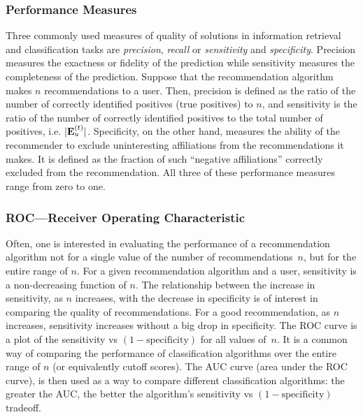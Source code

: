 \subsubsection{Performance Measures}
Three commonly used measures of quality of solutions in information retrieval and classification tasks are \textit{precision}, \textit{recall} or \textit{sensitivity} and \textit{specificity}. Precision measures the exactness or fidelity of the prediction while sensitivity measures the completeness of the prediction. Suppose that the recommendation algorithm makes $n$ recommendations to a user. Then, precision is defined as the ratio of the number of correctly identified positives (true positives) to $n$, and sensitivity is the ratio of the number of correctly identified positives to the total number of positives, i.e. $|\mathbf{E}_u^{(t)}|$. Specificity, on the other hand, measures the ability of the recommender to exclude uninteresting affiliations from the recommendations it makes. It is defined as the fraction of such ``negative affiliations'' correctly excluded from the recommendation. All three of these performance measures range from zero to one.

\subsubsection{ROC---Receiver Operating Characteristic}
Often, one is interested in evaluating the performance of a recommendation algorithm not for a single value of the number of recommendations~$n$, but for the entire range of $n$. For a given recommendation algorithm and a user, sensitivity is a non-decreasing function of $n$. The relationship between the increase in sensitivity, as $n$ increases, with the decrease in specificity is of interest in comparing the quality of recommendations. For a good recommendation, as $n$ increases, sensitivity increases without a big drop in specificity. The ROC curve is a plot of the sensitivity vs $(1 - \text{specificity})$ for all values of~$n$. It is a common way of comparing the performance of classification algorithms over the entire range of $n$ (or equivalently cutoff scores). The AUC curve (area under the ROC curve), is then used as a way to compare different classification algorithms: the greater the AUC, the better the algorithm's sensitivity vs $(1-\text{specificity})$ tradeoff.

